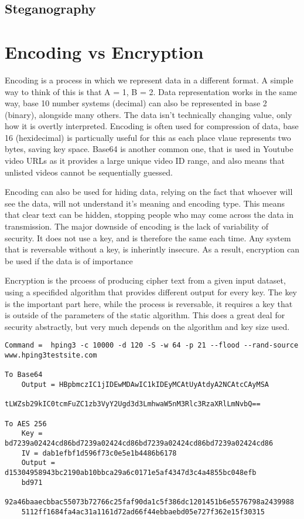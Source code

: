 \subsection{Steganography}

\section{Encoding vs Encryption}
Encoding is a process in which we represent data in a different format. A simple way to think of this is that A = 1, B = 2. Data representation works in the same way,
base 10 number systems (decimal) can also be represented in base 2 (binary), alongside many others. The data isn't technically changing value, only how it is overtly interpreted.
Encoding is often used for compression of data, base 16 (hexidecimal) is particually useful for this as each place vlaue represents two bytes, saving key space. Base64 is another common one, that is used in
Youtube video URLs as it provides a large unique video ID range, and also means that unlisted videos cannot be sequentially guessed.

Encoding can also be used for hiding data, relying on the fact that whoever will see the data, will not understand it's meaning and encoding type.
This means that clear text can be hidden, stopping people who may come across the data in transmission. The major downside of encoding is the lack of variability of security.
It does not use a key, and is therefore the same each time. Any system that is reversable without a key, is inherintly insecure. As a result, encryption can be used if the data is of importance

Encryption is the prcoess of producing cipher text from a given input dataset, using a specifided algorithm that provides different output for every key. The key is the important part here,
while the process is reversable, it requires a key that is outside of the parameters of the static algorithm. This does a great deal for security abstractly, but very much depends on the algorithm and key size used.

\begin{lstlisting}[label=EncodingVsEncryption,captionEncoding vs Encryption]
Command =  hping3 -c 10000 -d 120 -S -w 64 -p 21 --flood --rand-source www.hping3testsite.com

To Base64
    Output = HBpbmczIC1jIDEwMDAwIC1kIDEyMCAtUyAtdyA2NCAtcCAyMSA
             tLWZsb29kIC0tcmFuZC1zb3VyY2Ugd3d3LmhwaW5nM3Rlc3RzaXRlLmNvbQ==

To AES 256
    Key = bd7239a02424cd86bd7239a02424cd86bd7239a02424cd86bd7239a02424cd86
    IV = dab1efbf1d596f73c0e5e1b4486b6178
    Output = d15304958943bc2190ab10bbca29a6c0171e5af4347d3c4a4855bc048efb
    bd971
    92a46baaecbbac55073b72766c25faf90da1c5f386dc1201451b6e5576798a2439988
    5112ff1684fa4ac31a1161d72ad66f44ebbaebd05e727f362e15f30315

\end{lstlisting}

